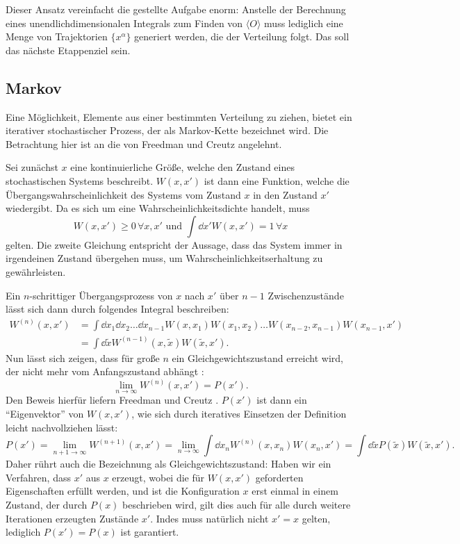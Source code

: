 Dieser Ansatz vereinfacht die gestellte Aufgabe enorm: Anstelle der Berechnung
eines unendlichdimensionalen Integrals zum Finden von $\langle O \rangle$
muss lediglich eine Menge von Trajektorien $\{x^\alpha\}$ generiert werden, die
der Verteilung folgt. Das soll das nächste Etappenziel sein.

\subsection{Markov}
Eine Möglichkeit, Elemente aus einer bestimmten Verteilung zu ziehen, 
bietet ein iterativer stochastischer Prozess, der als Markov-Kette bezeichnet
wird. Die Betrachtung hier ist an die von Freedman und Creutz \cite{freedmanCreutz}
angelehnt.

Sei zunächst $x$ eine kontinuierliche Größe, welche den Zustand eines
stochastischen Systems beschreibt. $W(x,x')$ ist dann eine Funktion,
welche die Übergangswahrscheinlichkeit des Systems vom Zustand $x$ in den Zustand
$x'$ wiedergibt. Da es sich um eine Wahrscheinlichkeitsdichte handelt, muss
\begin{equation} \label{eq:transitionProb}
    W(x,x') \geq 0\, \forall x, x'
    \text{ und }
    \int \dd{x'} W(x,x') = 1\, \forall x
\end{equation}
gelten. Die zweite Gleichung entspricht der Aussage, dass das System immer in
irgendeinen Zustand übergehen muss, um Wahrscheinlichkeitserhaltung zu
gewährleisten.

Ein $n$-schrittiger Übergangsprozess von $x$ nach $x'$ über $n-1$
Zwischenzustände lässt sich dann durch folgendes Integral beschreiben:
\begin{align*}
    W^{(n)}(x,x') &= \int \dd{x_1} \dd{x_2} \dots \dd{x_{n-1}}
        W(x,x_1) W(x_1, x_2) \dots W(x_{n-2}, x_{n-1}) W(x_{n-1},x')\\
    &= \int \dd{\tilde{x}} W^{(n-1)}(x, \tilde{x}) W(\tilde{x}, x').
\end{align*}
Nun lässt sich zeigen, dass für große $n$ ein Gleichgewichtszustand erreicht
wird, der nicht mehr vom Anfangszustand abhängt \cite{freedmanCreutz}:
\[
\lim_{n \rightarrow \infty} W^{(n)}(x,x') = P(x').
\]
Den Beweis hierfür liefern Freedman und Creutz \cite{freedmanCreutz}.
$P(x')$ ist dann ein \enquote{Eigenvektor} von $W(x,x')$, wie sich durch iteratives
Einsetzen der Definition leicht nachvollziehen lässt:
\[
P(x') 
= \lim_{n+1 \rightarrow \infty} W^{(n+1)}(x,x')
= \lim_{n \rightarrow \infty} \int \dd{x_n} W^{(n)}(x, x_n) W(x_n,x')
= \int \dd{\tilde{x}} P(\tilde{x}) W(\tilde{x},x').
\]
Daher rührt auch die Bezeichnung als Gleichgewichtszustand: Haben wir ein
Verfahren, dass $x'$ aus $x$ erzeugt, wobei die für $W(x,x')$ geforderten Eigenschaften
erfüllt werden, und ist die Konfiguration $x$
erst einmal in einem Zustand, der durch $P(x)$ beschrieben wird, gilt dies auch
für alle durch weitere Iterationen erzeugten Zustände $x'$. Indes muss natürlich
nicht $x' = x$ gelten, lediglich $P(x') = P(x)$ ist garantiert.

